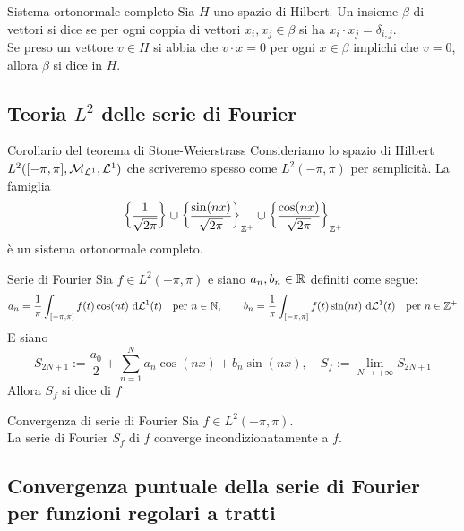 \documentclass{article}
\begin{document}
\begin{definition}{Sistema ortonormale completo}{}
    Sia $H$ uno spazio di Hilbert. Un insieme $\beta$ di vettori si dice  se per ogni coppia di vettori $x_i, x_j \in \beta$ si ha $x_i \cdot x_j = \delta_{i,j}$.\\
    Se preso un vettore $v \in H$ si abbia  che $v\cdot x = 0$ per ogni $x \in \beta$ implichi che $v=0$, allora $\beta$ si dice  in $H$.
\end{definition}

\subsection{Teoria $L^2$ delle serie di Fourier}

\begin{theorem}{Corollario del teorema di Stone-Weierstrass}{}
    Consideriamo lo spazio di Hilbert $L^2([-\pi,\pi], \mathcal{M}_{\mathcal{L}^1}, \mathcal{L}^1)$ che scriveremo spesso come $L^2(-\pi,\pi)$ per semplicità. La famiglia 
    \[ \left\{ \frac{1}{\sqrt{2\pi}}\right\} \cup \left\{ \frac{\sin(nx)}{\sqrt{2\pi}} \right\}_{\mathbb{Z}^+} \cup \left\{ \frac{\cos(nx)}{\sqrt{2\pi}} \right\}_{\mathbb{Z}^+} \]
    è un sistema ortonormale completo.
\end{theorem}

\begin{definition}{Serie di Fourier}{}
    Sia $f \in L^2(-\pi,\pi)$ e siano $a_n, b_n\in \mathbb{R}$ definiti come segue:
    \[a_n = \frac{1}{\pi} \int_{[-\pi,\pi]} f(t) \cos(nt) \text{ d} \mathcal{L}^1(t) \quad \text{per } n \in \mathbb{N}, \quad \quad b_n = \frac{1}{\pi} \int_{[-\pi,\pi]} f(t) \sin(nt) \text{ d} \mathcal{L}^1(t) \quad \text{per } n \in \mathbb{Z}^+ \]   
    E siano
    \[S_{2N+1} := \frac{a_0}{2} + \sum_{n=1}^{N} a_n \cos(nx) + b_n\sin(nx), \quad S_f:=\lim_{N \to +\infty} S_{2N+1}\]
    Allora $S_f$ si dice  di $f$ 
\end{definition}

\begin{theorem}{Convergenza di serie di Fourier}{}
    Sia $f \in L^2(-\pi,\pi)$.\\ La serie di Fourier $S_f$ di $f$ converge incondizionatamente a $f$.
\end{theorem}

\subsection{Convergenza puntuale della serie di Fourier per funzioni regolari a tratti}
\end{document}
